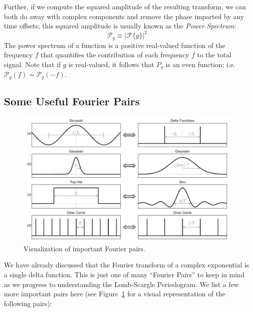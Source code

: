 \documentclass[preprint]{aastex}
\newcommand{\Fig}[1]{Figure~\ref{fig:#1}}
\newcommand{\figlabel}[1]{\label{fig:#1}}
\newcommand{\eqlabel}[1]{\label{eq:#1}}
\begin{document}
Further, if we compute the squared amplitude of the resulting transform, we
can both do away with complex components and remove the phase imparted by any
time offsets; this squared amplitude is usually known as the
{\it Power Spectrum}:
\begin{equation}
  \mathcal{P}_g \equiv \left|\mathcal{F}\{g\}\right|^2
  \eqlabel{power-spectrum}
\end{equation}
The power spectrum of a function is a positive real-valued function of the
frequency $f$ that quantifies the contribution of each frequency $f$ to
the total signal.
Note that if $g$ is real-valued, it follows that $P_g$ is an even function;
{i.e.} $\mathcal{P}_g(f) = \mathcal{P}_g(-f)$.

\subsection{Some Useful Fourier Pairs}

\begin{figure}[ht]
\centering
\includegraphics[width=\textwidth]{fig03_Fourier_pairs}
\caption{Visualization of important Fourier pairs.\figlabel{fourier-pairs}}
\end{figure}

We have already discussed that the Fourier transform of a complex exponential is a single delta function.
This is just one of many ``Fourier Pairs'' to keep in mind as we progress to understanding the Lomb-Scargle Periodogram.
We list a few more important pairs here (see \Fig{fourier-pairs} for a visual representation of the following pairs):
\end{document}
